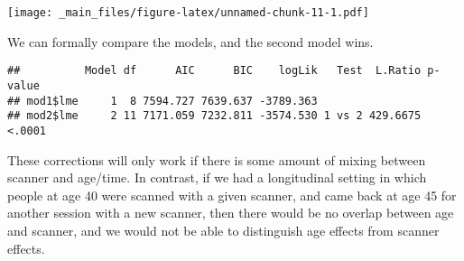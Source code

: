 \documentclass[
]{book}
\newenvironment{Shaded}{\begin{snugshade}}{\end{snugshade}}
\newcommand{\FunctionTok}[1]{\textcolor[rgb]{0.00,0.00,0.00}{#1}}
\newcommand{\NormalTok}[1]{#1}
\newcommand{\SpecialCharTok}[1]{\textcolor[rgb]{0.00,0.00,0.00}{#1}}
\begin{document}
\texttt{[image: \_main\_files/figure-latex/unnamed-chunk-11-1.pdf]}

We can formally compare the models, and the second model wins.

\begin{Shaded}
\end{Shaded}

\begin{verbatim}
##          Model df      AIC      BIC    logLik   Test  L.Ratio p-value
## mod1$lme     1  8 7594.727 7639.637 -3789.363                        
## mod2$lme     2 11 7171.059 7232.811 -3574.530 1 vs 2 429.6675  <.0001
\end{verbatim}

These corrections will only work if there is some amount of mixing between scanner and age/time. In contrast, if we had a longitudinal setting in which people at age 40 were scanned with a given scanner, and came back at age 45 for another session with a new scanner, then there would be no overlap between age and scanner, and we would not be able to distinguish age effects from scanner effects.

  
\end{document}
